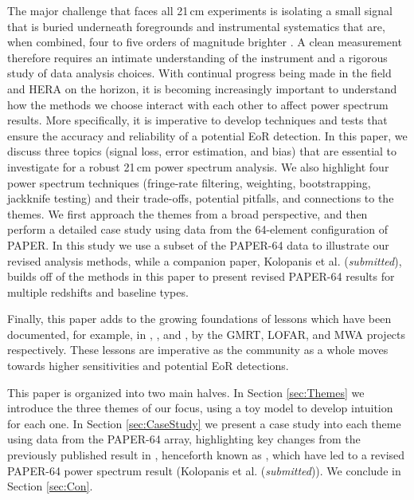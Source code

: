 \documentclass[preprint2,numberedappendix,tighten]{aastex6}  %
\begin{document}
The major challenge that faces all 21\,cm experiments is isolating a small signal that is buried underneath foregrounds and 
instrumental systematics that are, when combined, four to five orders of magnitude brighter \citep[e.g.,][]{santos_et_al2005, ali_et_al2008, deOliveiraCosta_et_al2008, jelic_et_al2008, bernardi_et_al2009, bernardi_et_al2010, ghosh_et_al2011, pober_et_al2013b, bernardi_et_al2013, dillon_et_al2014, kohn_et_al2016}. A clean measurement therefore requires an intimate understanding of the instrument and a rigorous study of data analysis choices. With continual progress being made 
in the field and HERA on the horizon, it is becoming increasingly important to understand how the methods we choose interact 
with each other to affect power spectrum results. More specifically, it is imperative to develop techniques and tests that ensure 
the accuracy and reliability of a potential EoR detection. In this paper, we discuss three topics (signal loss, error estimation, and bias) that are essential to investigate 
for a robust 21\,cm power spectrum analysis. We also highlight four power spectrum techniques (fringe-rate filtering, weighting, bootstrapping, jackknife testing) and their trade-offs, potential 
pitfalls, and connections to the themes. We first approach the themes from a broad perspective, and then perform a detailed 
case study using data from the 64-element configuration of PAPER. In this study we use a subset of the PAPER-64 data to illustrate our revised analysis methods, while a companion paper, Kolopanis et al. (\textit{submitted}), builds off of the methods in this paper to present revised PAPER-64 results for multiple redshifts and baseline types.

Finally, this paper adds to the growing foundations of lessons which have been documented, for example, in \citet{Paciga2013}, \citet{Patil2016}, and \citet{Jacobs2016}, by the GMRT, LOFAR, and MWA projects respectively. These lessons are imperative as the community as a whole moves towards higher sensitivities and potential EoR detections.

This paper is organized into two main halves. In Section \ref{sec:Themes} we introduce the three themes of our focus, using a 
toy model to develop intuition for each one. In Section \ref{sec:CaseStudy} we present a case study into each theme using data 
from the PAPER-64 array, highlighting key changes from the previously published result in \citet{ali_et_al2015}, henceforth known as , which have led to a 
revised PAPER-64 power spectrum result (Kolopanis et al. (\textit{submitted})). We conclude in Section \ref{sec:Con}.
\end{document}
